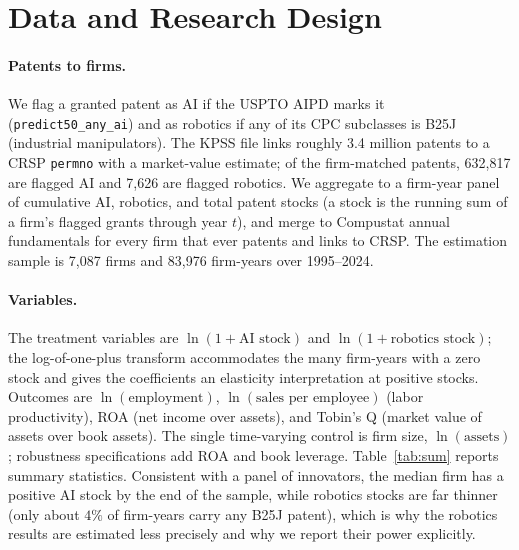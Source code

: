\documentclass[12pt]{article}
\begin{document}
\section{Data and Research Design}\label{sec:data}
\paragraph{Patents to firms.} We flag a granted patent as AI if the USPTO AIPD marks it
(\texttt{predict50\_any\_ai}) and as robotics if any of its CPC subclasses is B25J (industrial
manipulators). The KPSS file links roughly 3.4 million patents to a CRSP \texttt{permno} with a
market-value estimate; of the firm-matched patents, 632{,}817 are flagged AI and 7{,}626 are
flagged robotics. We aggregate to a firm-year panel of cumulative AI, robotics, and total patent
stocks (a stock is the running sum of a firm's flagged grants through year $t$), and merge to
Compustat annual fundamentals for every firm that ever patents and links to CRSP. The estimation
sample is 7{,}087 firms and 83{,}976 firm-years over 1995--2024.

\paragraph{Variables.} The treatment variables are $\ln(1+\text{AI stock})$ and
$\ln(1+\text{robotics stock})$; the log-of-one-plus transform accommodates the many firm-years
with a zero stock and gives the coefficients an elasticity interpretation at positive stocks.
Outcomes are $\ln(\text{employment})$, $\ln(\text{sales per employee})$ (labor productivity),
ROA (net income over assets), and Tobin's Q (market value of assets over book assets). The single
time-varying control is firm size, $\ln(\text{assets})$; robustness specifications add ROA and
book leverage. Table~\ref{tab:sum} reports summary statistics. Consistent with a panel of
innovators, the median firm has a positive AI stock by the end of the sample, while robotics
stocks are far thinner (only about $4\%$ of firm-years carry any B25J patent), which is why the
robotics results are estimated less precisely and why we report their power explicitly.
\end{document}
